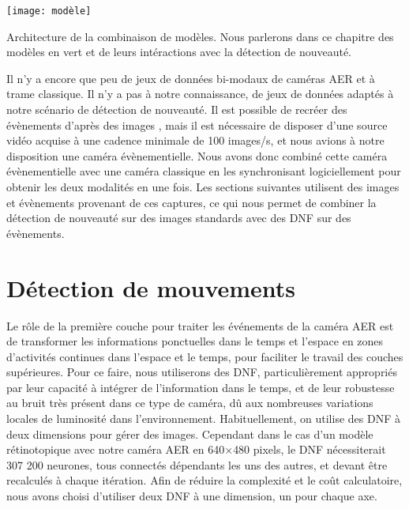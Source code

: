 	\begin{figureth}
		\begin{subfigureth}{\textwidth}
			\texttt{[image: modèle]}
		\end{subfigureth}
		\caption[Architecture de la combinaison de modèles]{Architecture de la combinaison de modèles. Nous parlerons dans ce chapitre des modèles en vert et de leurs intéractions avec la détection de nouveauté.}\label{fig:track:plane}
	\end{figureth}

	Il n'y a encore que peu de jeux de données bi-modaux de caméras AER et à trame classique. Il n'y a pas à notre connaissance, de jeux de données adaptés à notre scénario de détection de nouveauté. Il est possible de recréer des évènements d'après des images \cite{hu2021v2e}, mais il est nécessaire de disposer d'une source vidéo acquise à une cadence minimale de 100 images/s, et nous avions à notre disposition une caméra évènementielle. Nous avons donc combiné cette caméra évènementielle avec une caméra classique en les synchronisant logiciellement pour obtenir les deux modalités en une fois. Les sections suivantes utilisent des images et évènements provenant de ces captures, ce qui nous permet de combiner la détection de nouveauté sur des images standards avec des DNF sur des évènements.

	\newpage

	\section{Détection de mouvements}

	Le rôle de la première couche pour traiter les événements de la caméra AER est de transformer les informations ponctuelles dans le temps et l'espace en zones d'activités continues dans l'espace et le temps, pour faciliter le travail des couches supérieures. Pour ce faire, nous utiliserons des DNF, particulièrement appropriés par leur capacité à intégrer de l'information dans le temps, et de leur robustesse au bruit très présent dans ce type de caméra, dû aux nombreuses variations locales de luminosité dans l'environnement. Habituellement, on utilise des DNF à deux dimensions pour gérer des images. Cependant dans le cas d'un modèle rétinotopique avec notre caméra AER en 640$\times$480 pixels, le DNF nécessiterait 307 200 neurones, tous connectés dépendants les uns des autres, et devant être recalculés à chaque itération. Afin de réduire la complexité et le coût calculatoire, nous avons choisi d'utiliser deux DNF à une dimension, un pour chaque axe.

